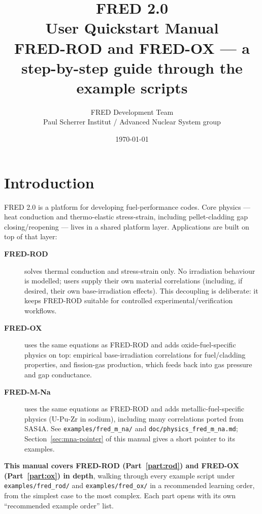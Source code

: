 \documentclass[11pt,a4paper]{article}
\title{%
  \textbf{FRED 2.0}\\[8pt]
  \large User Quickstart Manual\\[4pt]
  \normalsize FRED-ROD and FRED-OX --- a step-by-step guide through the example scripts
}
\author{FRED Development Team\\
        \small Paul Scherrer Institut / Advanced Nuclear System group}
\date{\today}
\begin{document}

\maketitle
\tableofcontents
\newpage

\section{Introduction}

FRED 2.0 is a platform for developing fuel-performance codes.  Core physics
--- heat conduction and thermo-elastic stress-strain, including
pellet-cladding gap closing/reopening --- lives in a shared platform layer.
Applications are built on top of that layer:

\begin{description}
  \item[\textbf{FRED-ROD}] solves thermal conduction and stress-strain only.
        No irradiation behaviour is modelled; users supply their own material
        correlations (including, if desired, their own base-irradiation
        effects).  This decoupling is deliberate: it keeps FRED-ROD suitable
        for controlled experimental/verification workflows.
  \item[\textbf{FRED-OX}] uses the same equations as FRED-ROD and adds
        oxide-fuel-specific physics on top: empirical base-irradiation
        correlations for fuel/cladding properties, and fission-gas
        production, which feeds back into gas pressure and gap conductance.
  \item[\textbf{FRED-M-Na}] uses the same equations as FRED-ROD and adds
        metallic-fuel-specific physics (U-Pu-Zr in sodium), including many
        correlations ported from SAS4A.  See
        \texttt{examples/fred\_m\_na/} and \texttt{doc/physics\_fred\_m\_na.md};
        Section~\ref{sec:mna-pointer} of this manual gives a short pointer to
        its examples.
\end{description}

\textbf{This manual covers FRED-ROD (Part~\ref{part:rod}) and FRED-OX
(Part~\ref{part:ox}) in depth}, walking through every example script under
\texttt{examples/fred\_rod/} and \texttt{examples/fred\_ox/} in a recommended
learning order, from the simplest case to the most complex.  Each part opens
with its own ``recommended example order'' list.
\end{document}

